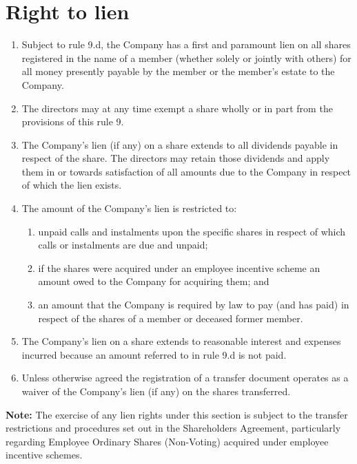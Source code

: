 \section{Right to lien}

\begin{enumerate}[label=(\alph*)]
    \item Subject to rule 9.d, the Company has a first and paramount lien on all shares registered in the name of a member (whether solely or jointly with others) for all money presently payable by the member or the member's estate to the Company.
    
    \item The directors may at any time exempt a share wholly or in part from the provisions of this rule 9.
    
    \item The Company's lien (if any) on a share extends to all dividends payable in respect of the share. The directors may retain those dividends and apply them in or towards satisfaction of all amounts due to the Company in respect of which the lien exists.
    
    \item The amount of the Company's lien is restricted to:
    \begin{enumerate}[label=(\roman*)]
        \item unpaid calls and instalments upon the specific shares in respect of which calls or instalments are due and unpaid;
        \item if the shares were acquired under an employee incentive scheme an amount owed to the Company for acquiring them; and
        \item an amount that the Company is required by law to pay (and has paid) in respect of the shares of a member or deceased former member.
    \end{enumerate}
    
    \item The Company's lien on a share extends to reasonable interest and expenses incurred because an amount referred to in rule 9.d is not paid.
    
    \item Unless otherwise agreed the registration of a transfer document operates as a waiver of the Company's lien (if any) on the shares transferred.
\end{enumerate}

\textbf{Note:} The exercise of any lien rights under this section is subject to the transfer restrictions and procedures set out in the Shareholders Agreement, particularly regarding Employee Ordinary Shares (Non-Voting) acquired under employee incentive schemes. 